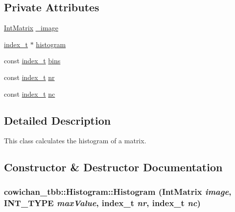 \subsection*{Private Attributes}
\begin{CompactItemize}
\item 
\hyperlink{cowichan_8hpp_82321152ddeeefe9c61350a42ed9e7af}{IntMatrix} \hyperlink{classcowichan__tbb_1_1_histogram_61380a3024f267b7774c5be8866c4d24}{\_\-image}
\item 
\hyperlink{cowichan_8hpp_5b04577d5d21124855deaad298595371}{index\_\-t} $\ast$ \hyperlink{classcowichan__tbb_1_1_histogram_6b904f84e79ce3a05178df4fbaf60beb}{histogram}
\item 
const \hyperlink{cowichan_8hpp_5b04577d5d21124855deaad298595371}{index\_\-t} \hyperlink{classcowichan__tbb_1_1_histogram_6cfc91c005e0a2e66da9d7a630c4892c}{bins}
\item 
const \hyperlink{cowichan_8hpp_5b04577d5d21124855deaad298595371}{index\_\-t} \hyperlink{classcowichan__tbb_1_1_histogram_aceebcf710541cd82d3d9d8fcef243cc}{nr}
\item 
const \hyperlink{cowichan_8hpp_5b04577d5d21124855deaad298595371}{index\_\-t} \hyperlink{classcowichan__tbb_1_1_histogram_20345a7d3c1bc558e4b892681549bfda}{nc}
\end{CompactItemize}


\subsection{Detailed Description}
This class calculates the histogram of a matrix. 

\subsection{Constructor \& Destructor Documentation}
\hypertarget{classcowichan__tbb_1_1_histogram_2a8e6b95c2a1ec48465550dbba3cabde}{
\subsubsection[{Histogram}]{\setlength{\rightskip}{0pt plus 5cm}cowichan\_\-tbb::Histogram::Histogram ({\bf IntMatrix} {\em image}, \/  {\bf INT\_\-TYPE} {\em maxValue}, \/  {\bf index\_\-t} {\em nr}, \/  {\bf index\_\-t} {\em nc})}}
\label{classcowichan__tbb_1_1_histogram_2a8e6b95c2a1ec48465550dbba3cabde}



